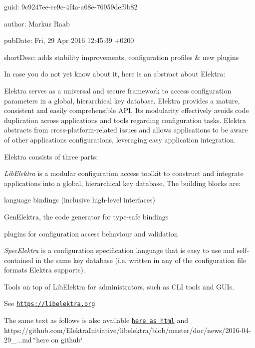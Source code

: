 
\begin{DoxyItemize}
\item guid\+: 9c9247ee-\/ee9c-\/4f4a-\/a68e-\/76959def9b82
\item author\+: Markus Raab
\item pub\+Date\+: Fri, 29 Apr 2016 12\+:45\+:39 +0200
\item short\+Desc\+: adds stability improvements, configuration profiles \& new plugins
\end{DoxyItemize}

In case you do not yet know about it, here is an abstract about Elektra\+:

Elektra serves as a universal and secure framework to access configuration parameters in a global, hierarchical key database. Elektra provides a mature, consistent and easily comprehensible A\+PI. Its modularity effectively avoids code duplication across applications and tools regarding configuration tasks. Elektra abstracts from cross-\/platform-\/related issues and allows applications to be aware of other applications\textquotesingle{} configurations, leveraging easy application integration.

Elektra consists of three parts\+:


\begin{DoxyEnumerate}
\item {\itshape Lib\+Elektra} is a modular configuration access toolkit to construct and integrate applications into a global, hierarchical key database. The building blocks are\+:
\begin{DoxyItemize}
\item language bindings (inclusive high-\/level interfaces)
\item Gen\+Elektra, the code generator for type-\/safe bindings
\item plugins for configuration access behaviour and validation
\end{DoxyItemize}
\item {\itshape Spec\+Elektra} is a configuration specification language that is easy to use and self-\/contained in the same key database (i.\+e. written in any of the configuration file formats Elektra supports).
\item Tools on top of Lib\+Elektra for administrators, such as C\+LI tools and G\+U\+Is.
\end{DoxyEnumerate}

See \href{https://libelektra.org}{\tt https\+://libelektra.\+org}

The same text as follows is also available \href{https://doc.libelektra.org/news/9c9247ee-ee9c-4f4a-a68e-76959def9b82.html}{\tt here as html} and https\+://github.com/\+Elektra\+Initiative/libelektra/blob/master/doc/news/2016-\/04-\/29\+\_...\+md \char`\"{}here on github\char`\"{}



